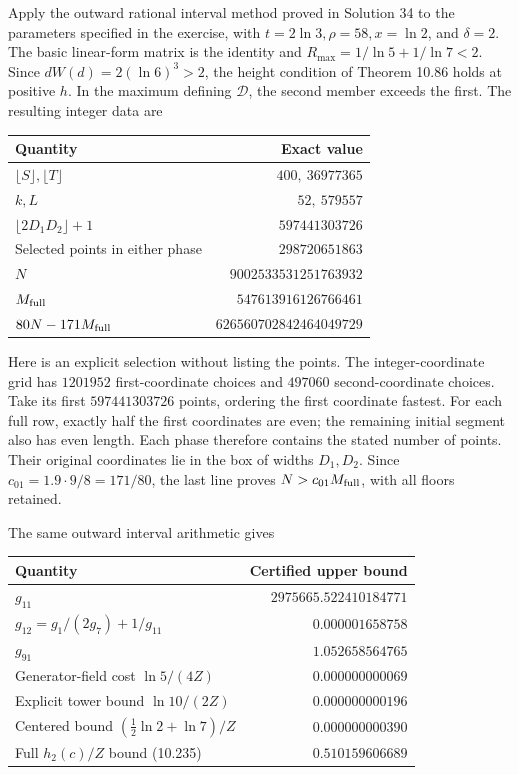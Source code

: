 \documentclass[
  11pt,
  a4paper,
]{article}
\newcounter{none} %
\begin{document}
Apply the outward rational interval method proved in Solution 34 to the
parameters specified in the exercise, with \(t=2\ln3,\rho=58,x=\ln2\),
and \(\delta=2\). The basic linear-form matrix is the identity and
\(R_{\max}=1/\ln5+1/\ln7<2\). Since \(dW(d)=2(\ln6)^3>2\), the height
condition of Theorem 10.86 holds at positive \(h\). In the maximum
defining \(\mathcal D\), the second member exceeds the first. The
resulting integer data are

{\def\LTcaptype{none} %
\begin{longtable}[]{@{}lr@{}}
\toprule\noalign{}
Quantity & Exact value \\
\midrule\noalign{}
\endhead
\bottomrule\noalign{}
\endlastfoot
\(\lfloor S\rfloor,\lfloor T\rfloor\) & \(400,\ 36977365\) \\
\(k,L\) & \(52,\ 579557\) \\
\(\lfloor2D_1D_2\rfloor+1\) & \(597441303726\) \\
Selected points in either phase & \(298720651863\) \\
\(N\) & \(9002533531251763932\) \\
\(M_{\rm full}\) & \(547613916126766461\) \\
\(80N-171M_{\rm full}\) & \(626560702842464049729\) \\
\end{longtable}
}

Here is an explicit selection without listing the points. The
integer-coordinate grid has \(1201952\) first-coordinate choices and
\(497060\) second-coordinate choices. Take its first \(597441303726\)
points, ordering the first coordinate fastest. For each full row,
exactly half the first coordinates are even; the remaining initial
segment also has even length. Each phase therefore contains the stated
number of points. Their original coordinates lie in the box of widths
\(D_1,D_2\). Since \(c_{01}=1.9\cdot9/8=171/80\), the last line proves
\(N>c_{01}M_{\rm full}\), with all floors retained.

The same outward interval arithmetic gives

{\def\LTcaptype{none} %
\begin{longtable}[]{@{}lr@{}}
\toprule\noalign{}
Quantity & Certified upper bound \\
\midrule\noalign{}
\endhead
\bottomrule\noalign{}
\endlastfoot
\(g_{11}\) & \(2975665.522410184771\) \\
\(g_{12}=g_1/(2g_7)+1/g_{11}\) & \(0.000001658758\) \\
\(g_{91}\) & \(1.052658564765\) \\
Generator-field cost \(\ln5/(4Z)\) & \(0.000000000069\) \\
Explicit tower bound \(\ln10/(2Z)\) & \(0.000000000196\) \\
Centered bound \((\frac12\ln2+\ln7)/Z\) & \(0.000000000390\) \\
Full \(h_2(c)/Z\) bound (10.235) & \(0.510159606689\) \\
\end{longtable}
}
\end{document}
